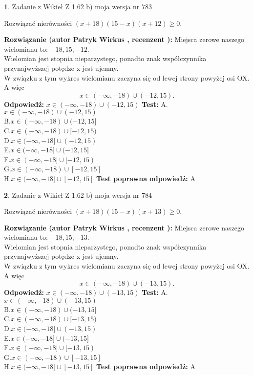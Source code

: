 \documentclass[12pt, a4paper]{article}
\theoremstyle{definition} %
\newtheorem{zad}{}
\newcommand{\zadStart}[1]{\begin{zad}#1\newline}
\newcommand{\zadStop}{\end{zad}}
\newcommand{\rozwStart}[2]{\noindent \textbf{Rozwiązanie (autor #1 , recenzent #2): }\newline}
\newcommand{\rozwStop}{\newline}
\newcommand{\odpStart}{\noindent \textbf{Odpowiedź:}\newline}
\newcommand{\odpStop}{\newline}
\newcommand{\testStart}{\noindent \textbf{Test:}\newline}
\newcommand{\testStop}{\newline}
\newcommand{\kluczStart}{\noindent \textbf{Test poprawna odpowiedź:}\newline}
\newcommand{\kluczStop}{\newline}
\begin{document}
\zadStart{Zadanie z Wikieł Z 1.62 b) moja wersja nr 783}

Rozwiązać nierówności $(x+18)(15-x)(x+12)\ge0$.
\zadStop
\rozwStart{Patryk Wirkus}{}
Miejsca zerowe naszego wielomianu to: $-18, 15, -12$.\\
Wielomian jest stopnia nieparzystego, ponadto znak współczynnika przy\linebreak najwyższej potędze x jest ujemny.\\ W związku z tym wykres wielomianu zaczyna się od lewej strony powyżej osi OX. A więc $$x \in (-\infty,-18) \cup (-12,15).$$
\rozwStop
\odpStart
$x \in (-\infty,-18) \cup (-12,15)$
\odpStop
\testStart
A.$x \in (-\infty,-18) \cup (-12,15)$\\
B.$x \in (-\infty,-18) \cup (-12,15]$\\
C.$x \in (-\infty,-18) \cup [-12,15)$\\
D.$x \in (-\infty,-18] \cup (-12,15)$\\
E.$x \in (-\infty,-18] \cup (-12,15]$\\
F.$x \in (-\infty,-18] \cup [-12,15)$\\
G.$x \in (-\infty,-18) \cup [-12,15]$\\
H.$x \in (-\infty,-18] \cup [-12,15]$
\testStop
\kluczStart
A
\kluczStop



\zadStart{Zadanie z Wikieł Z 1.62 b) moja wersja nr 784}

Rozwiązać nierówności $(x+18)(15-x)(x+13)\ge0$.
\zadStop
\rozwStart{Patryk Wirkus}{}
Miejsca zerowe naszego wielomianu to: $-18, 15, -13$.\\
Wielomian jest stopnia nieparzystego, ponadto znak współczynnika przy\linebreak najwyższej potędze x jest ujemny.\\ W związku z tym wykres wielomianu zaczyna się od lewej strony powyżej osi OX. A więc $$x \in (-\infty,-18) \cup (-13,15).$$
\rozwStop
\odpStart
$x \in (-\infty,-18) \cup (-13,15)$
\odpStop
\testStart
A.$x \in (-\infty,-18) \cup (-13,15)$\\
B.$x \in (-\infty,-18) \cup (-13,15]$\\
C.$x \in (-\infty,-18) \cup [-13,15)$\\
D.$x \in (-\infty,-18] \cup (-13,15)$\\
E.$x \in (-\infty,-18] \cup (-13,15]$\\
F.$x \in (-\infty,-18] \cup [-13,15)$\\
G.$x \in (-\infty,-18) \cup [-13,15]$\\
H.$x \in (-\infty,-18] \cup [-13,15]$
\testStop
\kluczStart
A
\kluczStop
\end{document}

